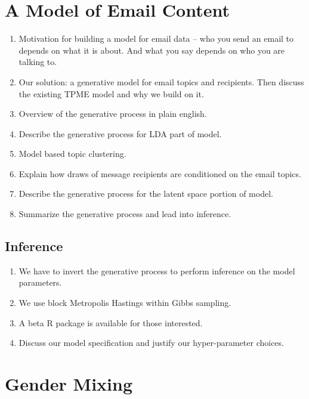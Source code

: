 \documentclass[fleqn]{MJDArticle}
\begin{document}
\section{A Model of Email Content}
\begin{enumerate}
	\item Motivation for building a model for email data -- who you send an email to depends on what it is about. And what you say depends on who you are talking to. 
	\item Our solution: a generative model for email topics and recipients. Then discuss the existing TPME model and why we build on it. 
	\item Overview of the generative process in plain english.
	\item Describe the generative process for LDA part of model.
	\item Model based topic clustering.
	\item Explain how draws of message recipients are conditioned on the email topics. 
	\item Describe the generative process for the latent space portion of model.
	\item Summarize the generative process and lead into inference. 
\end{enumerate}

\subsection{Inference}
\begin{enumerate}
	\item We have to invert the generative process to perform inference on the model parameters.
	\item We use block Metropolis Hastings within Gibbs sampling.
	\item A beta R package is available for those interested.
	\item Discuss our model specification and justify our hyper-parameter choices.
\end{enumerate}

\section{Gender Mixing}
\end{document}

